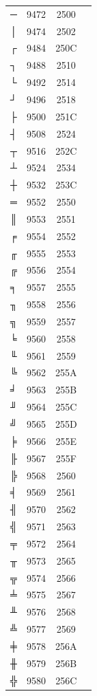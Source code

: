 ﻿\documentclass[10pt]{article}
\begin{document}
\begin{tabular}{crcl}
─&9472&2500&\\
│&9474&2502&\\
┌&9484&250C&\\
┐&9488&2510&\\
└&9492&2514&\\
┘&9496&2518&\\
├&9500&251C&\\
┤&9508&2524&\\
┬&9516&252C&\\
┴&9524&2534&\\
┼&9532&253C&\\
═&9552&2550&\\
║&9553&2551&\\
╒&9554&2552&\\
╓&9555&2553&\\
╔&9556&2554&\\
╕&9557&2555&\\
╖&9558&2556&\\
╗&9559&2557&\\
╘&9560&2558&\\
╙&9561&2559&\\
╚&9562&255A&\\
╛&9563&255B&\\
╜&9564&255C&\\
╝&9565&255D&\\
╞&9566&255E&\\
╟&9567&255F&\\
╠&9568&2560&\\
╡&9569&2561&\\
╢&9570&2562&\\
╣&9571&2563&\\
╤&9572&2564&\\
╥&9573&2565&\\
╦&9574&2566&\\
╧&9575&2567&\\
╨&9576&2568&\\
╩&9577&2569&\\
╪&9578&256A&\\
╫&9579&256B&\\
╬&9580&256C&\\
\end{tabular}
\end{document}
